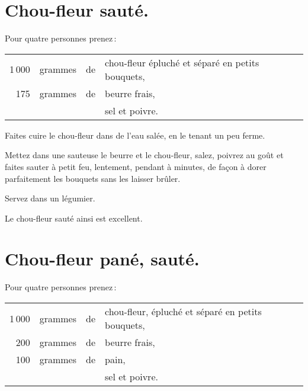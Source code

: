 \section*{\centering Chou-fleur sauté.}
{}

Pour quatre personnes prenez :

\footnotesize
\begin{longtable}{rrrp{16em}}
  1 000 & grammes & de & chou-fleur épluché et séparé en petits bouquets,                                 \\
    175 & grammes & de & beurre frais,                                                                    \\
        &         &    & sel et poivre.                                                                   \\
\end{longtable}
\normalsize

Faites cuire le chou-fleur dans de l'eau salée, en le tenant un peu ferme.

Mettez dans une sauteuse le beurre et le chou-fleur, salez, poivrez au goût et
faites sauter à petit feu, lentement, pendant {\mmm} à {\mmm}
minutes, de façon à dorer parfaitement les bouquets sans les laisser brûler.

Servez dans un légumier.

Le chou-fleur sauté ainsi est excellent.

\section*{\centering Chou-fleur pané, sauté.}
{}

Pour quatre personnes prenez :

\footnotesize
\begin{longtable}{rrrp{16em}}
  1 000 & grammes & de & chou-fleur, épluché et séparé en petits bouquets,                                \\
    200 & grammes & de & beurre frais,                                                                    \\
    100 & grammes & de & pain,                                                                            \\
        &         &    & sel et poivre.                                                                   \\
\end{longtable}
\normalsize


